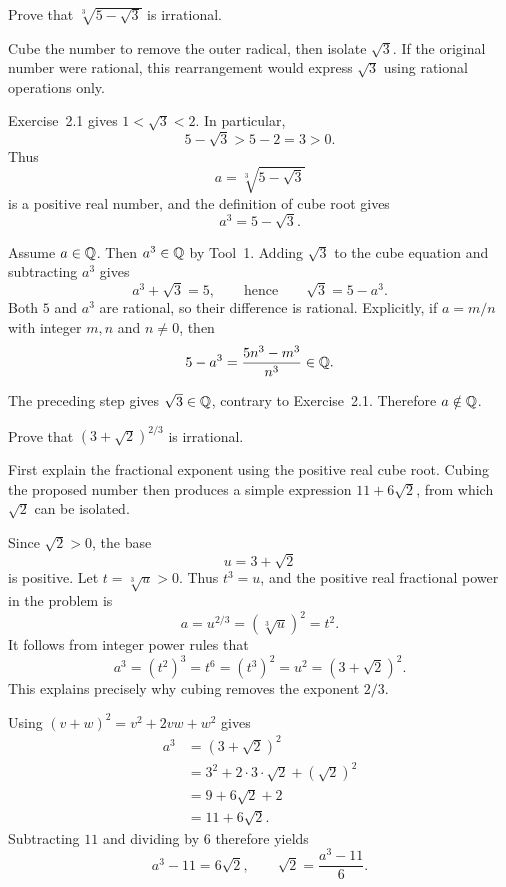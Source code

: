 
\goal Prove that $\sqrt[3]{5-\sqrt3}$ is irrational.

\idea Cube the number to remove the outer radical, then isolate
$\sqrt3$. If the original number were rational, this rearrangement
would express $\sqrt3$ using rational operations only.

Exercise~2.1 gives $1<\sqrt3<2$. In particular,
\[
 5-\sqrt3>5-2=3>0.
\]
Thus
\[
 a=\sqrt[3]{5-\sqrt3}
\]
is a positive real number, and the definition of cube root gives
\[
 a^3=5-\sqrt3.
\]

Assume $a\in\mathbb{Q}$. Then $a^3\in\mathbb{Q}$ by Tool~1. Adding $\sqrt3$ to the
cube equation and subtracting $a^3$ gives
\[
 a^3+\sqrt3=5,
 \qquad\text{hence}\qquad
 \sqrt3=5-a^3.
\]
Both $5$ and $a^3$ are rational, so their difference is rational.
Explicitly, if $a=m/n$ with integer $m,n$ and $n\ne0$, then
\[
 5-a^3=\frac{5n^3-m^3}{n^3}\in\mathbb{Q}.
\]

The preceding step gives $\sqrt3\in\mathbb{Q}$, contrary to Exercise~2.1.
Therefore $a\notin\mathbb{Q}$.


\goal Prove that $(3+\sqrt2)^{2/3}$ is irrational.

\idea First explain the fractional exponent using the positive real
cube root. Cubing the proposed number then produces a simple expression
$11+6\sqrt2$, from which $\sqrt2$ can be isolated.

Since $\sqrt2>0$, the base
\[
 u=3+\sqrt2
\]
is positive. Let $t=\sqrt[3]{u}>0$. Thus $t^3=u$, and the positive real
fractional power in the problem is
\[
 a=u^{2/3}=(\sqrt[3]{u})^2=t^2.
\]
It follows from integer power rules that
\[
 a^3=(t^2)^3=t^6=(t^3)^2=u^2=(3+\sqrt2)^2.
\]
This explains precisely why cubing removes the exponent $2/3$.

Using $(v+w)^2=v^2+2vw+w^2$ gives
\begin{align*}
 a^3
  &=(3+\sqrt2)^2\\
  &=3^2+2\cdot3\cdot\sqrt2+(\sqrt2)^2\\
  &=9+6\sqrt2+2\\
  &=11+6\sqrt2.
\end{align*}
Subtracting $11$ and dividing by $6$ therefore yields
\[
 a^3-11=6\sqrt2,
 \qquad
 \sqrt2=\frac{a^3-11}{6}.
\]

